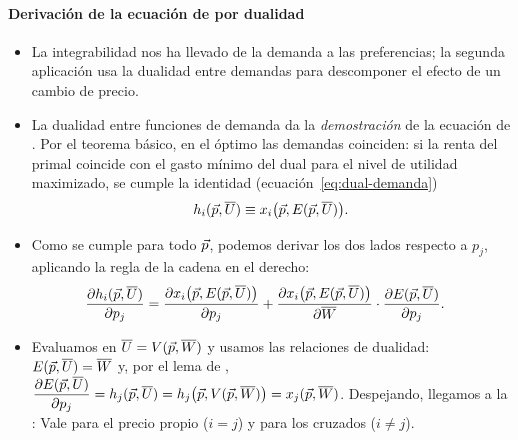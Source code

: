 \documentclass[11pt]{article}
\begin{document}
\paragraph{Derivación de la ecuación de  por dualidad}

\begin{itemize}
\item La integrabilidad nos ha llevado de la demanda a las preferencias; la segunda aplicación usa la dualidad entre demandas para descomponer el efecto de un cambio de precio.
\item La dualidad entre funciones de demanda da la \emph{demostración} de la ecuación de \textcite{Slutsky1915Bilancio}. Por el teorema básico, en el óptimo las demandas coinciden: si la renta del primal coincide con el gasto mínimo del dual para el nivel de utilidad maximizado, se cumple la identidad (ecuación~\eqref{eq:dual-demanda})
  \begin{equation*}
  h_i(\vec{p},\overline{U})\equiv x_i\big(\vec{p},E(\vec{p},\overline{U})\big).
  \end{equation*}
\item Como se cumple para todo $\vec{p}$, podemos derivar los dos lados respecto a $p_j$, aplicando la regla de la cadena en el derecho:
  \begin{align*}
  \frac{\partial h_i(\vec{p},\overline{U})}{\partial p_j}&=\frac{\partial x_i\big(\vec{p},E(\vec{p},\overline{U})\big)}{\partial p_j}+\frac{\partial x_i\big(\vec{p},E(\vec{p},\overline{U})\big)}{\partial\overline{W}}\cdot\frac{\partial E(\vec{p},\overline{U})}{\partial p_j}.
  \end{align*}
\item Evaluamos en $\overline{U}=V(\vec{p},\overline{W})$ y usamos las relaciones de dualidad: $E(\vec{p},\overline{U})=\overline{W}$ y, por el lema de , $\dfrac{\partial E(\vec{p},\overline{U})}{\partial p_j}=h_j(\vec{p},\overline{U})=h_j\big(\vec{p},V(\vec{p},\overline{W})\big)=x_j(\vec{p},\overline{W})$. Despejando, llegamos a la :
  Vale para el precio propio ($i=j$) y para los cruzados ($i\neq j$).\findemo
  \begin{itemize}

\end{itemize}
\end{itemize}
\end{document}
